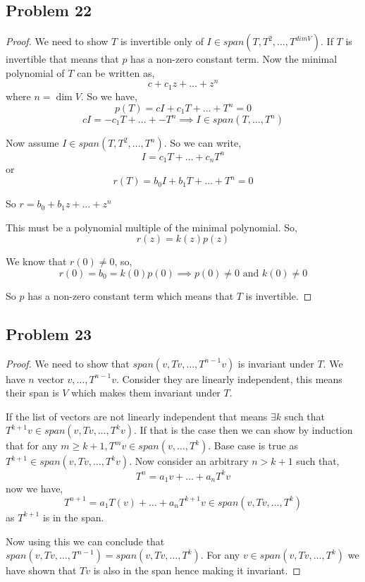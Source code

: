 \documentclass[a4paper]{report}
\begin{document}
\subsection*{Problem 22}
\begin{proof}
   We need to show $T$ is invertible only of $I \in span(T,T^2, \dots, T^{dim V})$. If $T$ is invertible that means that $p$ has a non-zero constant term. Now the minimal polynomial of $T$ can be written as, 
   $$ c + c_1z + \dots + z^{n} $$ where $n = \dim V$. So we have,  
   $$ p(T) = cI + c_1T + \dots + T^{n} = 0 $$ 
   $$ cI = - c_1T + \dots + -T^{n}  \implies I \in span(T,\dots,T^{n})$$ 


   Now assume $I \in span(T,T^2,\dots,T^{n})$. So we can write, 
   $$ I = c_1T + \dots + c_nT^{n} $$  or 
   $$r(T) =  b_0I + b_1T + \dots  + T^{n} = 0  $$ 

   So $r = b_0 + b_1z + \dots + z^{n}$

   This must be a polynomial multiple of the minimal polynomial.  So, 
   $$ r(z) = k(z) p(z) $$ 

   We know that $r(0) \ne 0$, so,  
   $$ r(0) = b_0 = k(0)p(0) \implies p(0) \ne 0 \text{ and } k(0) \ne 0 $$ 

   So $p$ has a non-zero constant term which means that $T$ is invertible.
\end{proof}


\subsection*{Problem 23}
\begin{proof}
We need to show that $span(v, Tv, \dots, T^{n -1}v)$ is invariant under $T$. We have $n$ vector $v, \dots, T^{n - 1}v$. Consider they are linearly independent, this means their span is $V$ which makes them invariant under $T$. 

If the list of vectors are not linearly independent that means $\exists k$ such that $T^{k + 1}v  \in span(v,Tv,\dots,T^{k}v)$. If that is the case then we can show by induction that for any $m \ge k + 1, T^{m}v \in span(v,\dots,T^{k}).$ Base case is true as $T^{k + 1} \in span(v,Tv,\dots,T^{k}v)$. Now consider an arbitrary $n > k + 1$ such that,  
$$ T^{n} = a_1v + \dots + a_nT^{k}v $$ 
now we have, 
$$ T^{n + 1} = a_1T(v) + \dots + a_nT^{k + 1}v  \in span(v,Tv,\dots,T^{k})$$  as $T^{k + 1}$ is in the span.

Now using this we can conclude that $span(v,Tv,\dots,T^{n - 1}) = span(v,Tv,\dots,T^{k})$. For any $v \in span(v,Tv,\dots,T^{k})$ we have shown that $Tv$ is also in the span hence making it invariant.

\end{proof}
\end{document}
